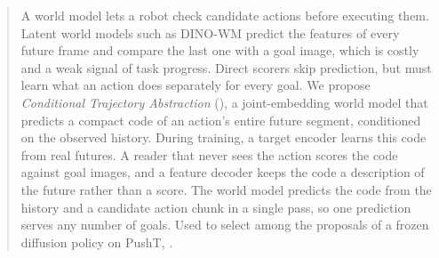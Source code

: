 \begin{abstract}
A world model lets a robot check candidate actions before executing them.
Latent world models such as DINO-WM predict the features of every future frame and compare the last one with a goal image, which is costly and a weak signal of task progress.
Direct scorers skip prediction, but must learn what an action does separately for every goal.
We propose \emph{Conditional Trajectory Abstraction} (\method), a joint-embedding world model that predicts a compact code of an action's entire future segment, conditioned on the observed history.
During training, a target encoder learns this code from real futures.
A reader that never sees the action scores the code against goal images, and a feature decoder keeps the code a description of the future rather than a score.
The world model predicts the code from the history and a candidate action chunk in a single pass, so one prediction serves any number of goals.
Used to select among the proposals of a frozen diffusion policy on PushT, \method {}.
\end{abstract}
